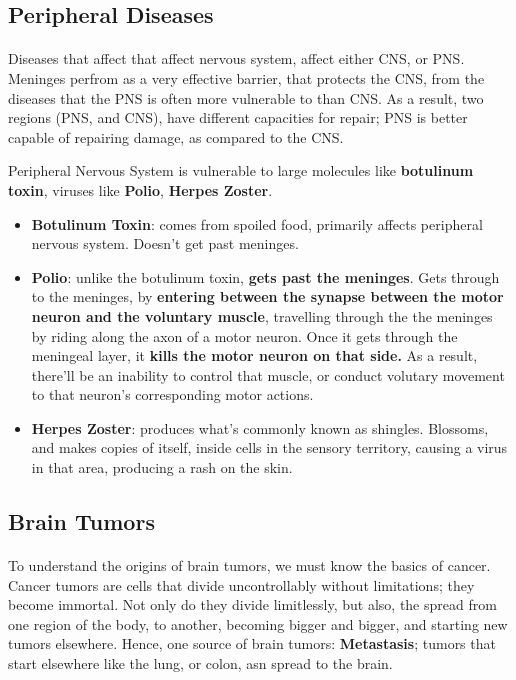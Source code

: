 \documentclass[12pt, a4paper]{article}
\begin{document}
\subsection{Peripheral Diseases}

\paragraph*{}
Diseases that affect that affect nervous system, affect either CNS, or PNS.
Meninges perfrom as a very effective barrier, that protects the CNS, from the diseases
that the PNS is often more vulnerable to than CNS. As a result, two regions (PNS, and CNS),
have different capacities for repair; PNS is better capable of repairing damage, as compared to the CNS.

Peripheral Nervous System is vulnerable to large molecules like \textbf{botulinum toxin}, viruses like \textbf{Polio},
\textbf{Herpes Zoster}.

\begin{itemize}
    \item \textbf{Botulinum Toxin}: comes from spoiled food, primarily affects
    peripheral nervous system. Doesn't get past meninges.
    \item \textbf{Polio}: unlike the botulinum toxin, \textbf{gets past the meninges}.
    Gets through to the meninges, by \textbf{entering between the synapse between the motor
    neuron and the voluntary muscle}, travelling through the the meninges by riding along
    the axon of a motor neuron. Once it gets through the meningeal layer, it \textbf{kills the motor neuron on 
    that side.} As a result, there'll be an inability to control that muscle, or conduct volutary movement to that neuron's corresponding motor actions.
    \item \textbf{Herpes Zoster}: produces what's commonly known as shingles.
    Blossoms, and makes copies of itself, inside cells in the sensory territory, causing a virus in that area,
    producing a rash on the skin.
\end{itemize}

\subsection{Brain Tumors}

\paragraph*{}
To understand the origins of brain tumors, we must know the basics of cancer.
Cancer tumors are cells that divide uncontrollably without limitations; they become immortal.
Not only do they divide limitlessly, but also, the spread from one region of the body, to another,
becoming bigger and bigger, and starting new tumors elsewhere. Hence, one source
of brain tumors: \textbf{Metastasis}; tumors that start elsewhere like the lung, or colon,
asn spread to the brain.
\end{document}
